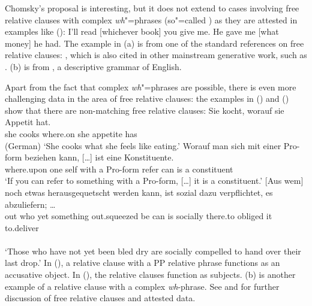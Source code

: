 \documentclass[output=paper
	        ,collection
	        ,collectionchapter
 	        ,biblatex
                ,babelshorthands
                ,newtxmath
                ,draftmode
                ,colorlinks, citecolor=brown
]{langscibook}
\begin{document}
Chomsky's proposal is interesting, but it does not extend to cases involving free relative clauses
with complex \emph{wh}"=phrases (so"=called ) as they are attested in examples like
(): 
\eal
\ex I'll read [whichever book] you give me.
\ex He gave me [what money] he had.
\zl
The example in (a) is from one of the standard references on free relative clauses:
, which is also cited in other mainstream generative work, such as
. (b) is from , a descriptive grammar of English.

Apart from the fact that complex \emph{wh}"=phrases are possible, there is even more challenging data in the area of
free relative clauses: the examples in () and () show that there are non-matching free
relative clauses:
\ea
\gll Sie kocht, worauf   sie Appetit  hat.\footnotemark\\
     she cooks  where.on she appetite has\\\hfill(German)
\glt `She cooks what she feels like eating.'
\z
\eal
\ex
\gll Worauf man sich mit einer Pro-form beziehen kann, [\ldots]  ist eine Kon\-sti\-tu\-en\-te.\footnotemark\\
     where.upon one self with a Pro-form  refer   can  {}        is  a    constituent\\
\glt `If you can refer to something with a Pro-form, [\ldots] it is a constituent.'
\ex
\gll {}[Aus wem] noch etwas herausgequetscht werden kann, ist sozial dazu ver\-pflich\-tet, es
abzuliefern; \ldots\label{bsp-droste}\footnotemark\\
  \spacebr{}out who yet something out.squeezed be can is socially there.to obliged it to.deliver\\
\\
\glt `Those who have not yet been bled dry are socially compelled to hand over their last drop.'
\zl
In (), a relative clause with a PP relative phrase functions as an accusative object. In
(), the relative clauses function as subjects. (b) is another example of a relative
clause with a complex \emph{wh}-phrase. See \citet{Bausewein90} and \citet{Mueller99b} for further discussion of free relative
clauses and attested data.
\end{document}
